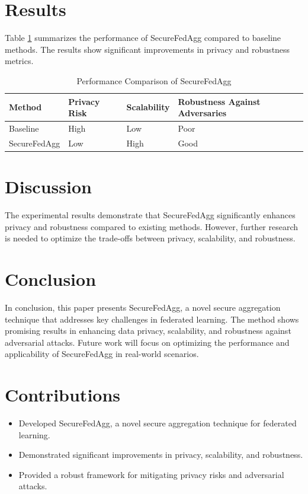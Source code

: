 \documentclass{article}
\begin{document}
\section{Results}
Table \ref{tab:results} summarizes the performance of SecureFedAgg compared to baseline methods. The results show significant improvements in privacy and robustness metrics.

\begin{table}[h]
    \centering
    \caption{Performance Comparison of SecureFedAgg}
    \label{tab:results}
    \begin{tabular}{@{}llll@{}}
        \toprule
        Method & Privacy Risk & Scalability & Robustness Against Adversaries \\
        \midrule
        Baseline & High & Low & Poor \\
        SecureFedAgg & Low & High & Good \\
        \bottomrule
    \end{tabular}
\end{table}

\section{Discussion}
The experimental results demonstrate that SecureFedAgg significantly enhances privacy and robustness compared to existing methods. However, further research is needed to optimize the trade-offs between privacy, scalability, and robustness.

\section{Conclusion}
In conclusion, this paper presents SecureFedAgg, a novel secure aggregation technique that addresses key challenges in federated learning. The method shows promising results in enhancing data privacy, scalability, and robustness against adversarial attacks. Future work will focus on optimizing the performance and applicability of SecureFedAgg in real-world scenarios.

\section{Contributions}
\begin{itemize}
    \item Developed SecureFedAgg, a novel secure aggregation technique for federated learning.
    \item Demonstrated significant improvements in privacy, scalability, and robustness.
    \item Provided a robust framework for mitigating privacy risks and adversarial attacks.
\end{itemize}



\end{document}
